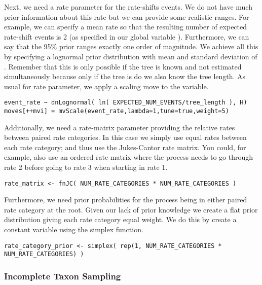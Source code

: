 Next, we need a rate parameter for the rate-shifts events.
We do not have much prior information about this rate but we can provide some realistic ranges.
For example, we can specify a mean rate so that the resulting number of expected rate-shift events is 2 (as specified in our global variable ).
Furthermore, we can say that the 95\% prior ranges exactly one order of magnitude.
We achieve all this by specifying a lognormal prior distribution with mean  and standard deviation of .
Remember that this is only possible if the tree is known and not estimated simultaneously because only if the tree is do we also know the tree length.
As usual for rate parameter, we apply a scaling move to the  variable.
{\tt \begin{snugshade*}
\begin{lstlisting}
event_rate ~ dnLognormal( ln( EXPECTED_NUM_EVENTS/tree_length ), H)
moves[++mvi] = mvScale(event_rate,lambda=1,tune=true,weight=5)
\end{lstlisting}
\end{snugshade*}}

Additionally, we need a rate-matrix parameter providing the relative rates between paired rate categories.
In this case we simply use equal rates between each rate category; and thus use the Jukes-Cantor rate matrix.
You could, for example, also use an ordered rate matrix where the process needs to go through rate 2 before going to rate 3 when starting in rate 1.
{\tt \begin{snugshade*}
\begin{lstlisting}
rate_matrix <- fnJC( NUM_RATE_CATEGORIES * NUM_RATE_CATEGORIES )
\end{lstlisting}
\end{snugshade*}}
Furthermore, we need prior probabilities for the process being in either paired rate category at the root.
Given our lack of prior knowledge we create a flat prior distribution giving each rate category equal weight.
We do this by create a constant variable using the simplex function.
{\tt \begin{snugshade*}
\begin{lstlisting}
rate_category_prior <- simplex( rep(1, NUM_RATE_CATEGORIES * NUM_RATE_CATEGORIES) )
\end{lstlisting}
\end{snugshade*}}



\subsubsection{Incomplete Taxon Sampling}

